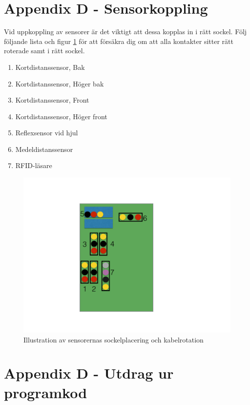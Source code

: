 \documentclass[a4paper,12pt,fleqn]{article}
\begin{document}

\newpage
\section*{Appendix D - Sensorkoppling \label{head:sensorkoppl}}

Vid uppkoppling av sensorer är det viktigt att dessa kopplas in i rätt sockel. 
Följ följande lista och figur \ref{fig:sensorkoppling} för att försäkra dig om att alla kontakter sitter rätt roterade samt i rätt sockel.

\begin{enumerate}
		\item Kortdistanssensor, Bak
		\item Kortdistanssensor, Höger bak
		\item Kortdistanssensor, Front
		\item Kortdistanssensor, Höger front
		\item Reflexsensor vid hjul
		\item Medeldistanssensor
		\item RFID-läsare
\end{enumerate}


\begin{figure}[htp] %
  \begin{center}
  \includegraphics[keepaspectratio=true,width=1\textwidth]{bilder/Sensorkoppling.jpg}  %
  \end{center}
  \caption{Illustration av sensorernas sockelplacering och kabelrotation} %
  \label{fig:sensorkoppling} %
\end{figure}


\newpage
\section*{Appendix D - Utdrag ur programkod}

\lstset{language=C++}

\end{document}
